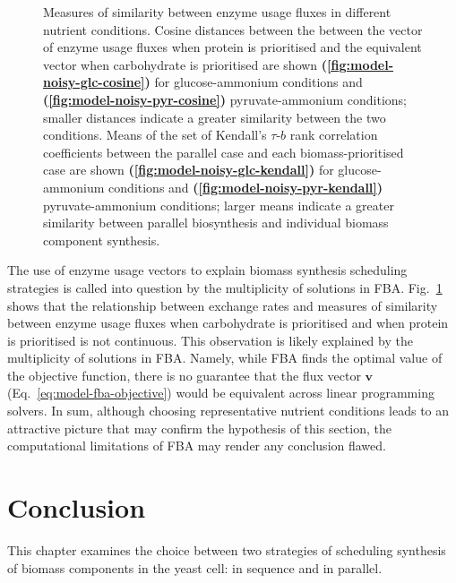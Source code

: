 \begin{figure}
  \caption[
    Measures of similarity between enzyme usage fluxes in different nutrient conditions
  ]{
    Measures of similarity between enzyme usage fluxes in different nutrient conditions.
    Cosine distances between the between the vector of enzyme usage fluxes when protein is prioritised and the equivalent vector when carbohydrate is prioritised are shown \textbf{(\ref{fig:model-noisy-glc-cosine})} for glucose-ammonium conditions and \textbf{(\ref{fig:model-noisy-pyr-cosine})} pyruvate-ammonium conditions; smaller distances indicate a greater similarity between the two conditions.
    Means of the set of Kendall's $\tau$-$b$ rank correlation coefficients between the parallel case and each biomass-prioritised case are shown \textbf{(\ref{fig:model-noisy-glc-kendall})} for glucose-ammonium conditions and \textbf{(\ref{fig:model-noisy-pyr-kendall})} pyruvate-ammonium conditions; larger means indicate a greater similarity between parallel biosynthesis and individual biomass component synthesis.
    }
  \label{fig:model-noisy}
\end{figure}

The use of enzyme usage vectors to explain biomass synthesis scheduling strategies is called into question by the multiplicity of solutions in FBA.
Fig.\ \ref{fig:model-noisy} shows that the relationship between exchange rates and measures of similarity between enzyme usage fluxes when carbohydrate is prioritised and when protein is prioritised is not continuous.
This observation is likely explained by the multiplicity of solutions in FBA.
Namely, while FBA finds the optimal value of the objective function, there is no guarantee that the flux vector $\mathbf{v}$ (Eq.\ \ref{eq:model-fba-objective}) would be equivalent across linear programming solvers.
In sum, although choosing representative nutrient conditions leads to an attractive picture that may confirm the hypothesis of this section, the computational limitations of FBA may render any conclusion flawed.


\section{Conclusion}
\label{subsec:model-conclusion}

This chapter examines the choice between two strategies of scheduling synthesis of biomass components in the yeast cell: in sequence and in parallel.

